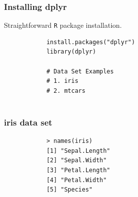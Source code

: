 \documentclass{beamer}
\begin{document}
%	
%	

	\begin{frame}[fragile]
		\frametitle{Installing dplyr}
		\large
		Straightforward \texttt{R} package installation.
		\begin{framed}
			\begin{verbatim}
			install.packages("dplyr")
			library(dplyr)
			
			# Data Set Examples
			# 1. iris
			# 2. mtcars
			
			\end{verbatim}
		\end{framed}
	\end{frame}
	
	\begin{frame}[fragile]
		\frametitle{iris data set}
		\Large
		\begin{framed}
			\begin{verbatim}
			> names(iris)
			[1] "Sepal.Length"
			[2] "Sepal.Width" 
			[3] "Petal.Length"
			[4] "Petal.Width" 
			[5] "Species"    
			\end{verbatim}
		\end{framed}
	\end{frame}
	
\end{document}
